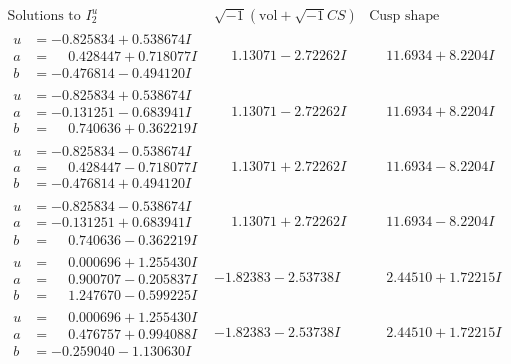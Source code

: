 \documentclass[1p]{elsarticle_modified}
\theoremstyle{definition}
\newcommand{\I}{\sqrt{-1}}
\begin{document}
$$\begin{array}{c|c|c}  
\text{Solutions to }I^u_{2}& \I (\text{vol} + \sqrt{-1}CS) & \text{Cusp shape}\\
 \hline 
\begin{aligned}
u &= -0.825834 + 0.538674 I \\
a &= \phantom{-}0.428447 + 0.718077 I \\
b &= -0.476814 - 0.494120 I\end{aligned}
 & \phantom{-}1.13071 - 2.72262 I & \phantom{-}11.6934 + 8.2204 I \\ \hline\begin{aligned}
u &= -0.825834 + 0.538674 I \\
a &= -0.131251 - 0.683941 I \\
b &= \phantom{-}0.740636 + 0.362219 I\end{aligned}
 & \phantom{-}1.13071 - 2.72262 I & \phantom{-}11.6934 + 8.2204 I \\ \hline\begin{aligned}
u &= -0.825834 - 0.538674 I \\
a &= \phantom{-}0.428447 - 0.718077 I \\
b &= -0.476814 + 0.494120 I\end{aligned}
 & \phantom{-}1.13071 + 2.72262 I & \phantom{-}11.6934 - 8.2204 I \\ \hline\begin{aligned}
u &= -0.825834 - 0.538674 I \\
a &= -0.131251 + 0.683941 I \\
b &= \phantom{-}0.740636 - 0.362219 I\end{aligned}
 & \phantom{-}1.13071 + 2.72262 I & \phantom{-}11.6934 - 8.2204 I \\ \hline\begin{aligned}
u &= \phantom{-}0.000696 + 1.255430 I \\
a &= \phantom{-}0.900707 - 0.205837 I \\
b &= \phantom{-}1.247670 - 0.599225 I\end{aligned}
 & -1.82383 - 2.53738 I & \phantom{-}2.44510 + 1.72215 I \\ \hline\begin{aligned}
u &= \phantom{-}0.000696 + 1.255430 I \\
a &= \phantom{-}0.476757 + 0.994088 I \\
b &= -0.259040 - 1.130630 I\end{aligned}
 & -1.82383 - 2.53738 I & \phantom{-}2.44510 + 1.72215 I \\ \hline\begin{aligned}

\end{aligned}
\end{array}$$
\end{document}
